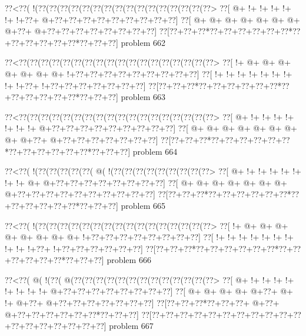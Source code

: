 \vbox{\vbox{\goo
\0??<\0??(\- !(\0??(\0??(\0??(\0??(\0??(\0??(\0??(\0??(\0??(\0??(\0??(\0??(\0??(\0??(\0??(\0??>
\0??[\- @+\- !+\- !+\- !+\- !+\- !+\- !+\0??+\- @+\0??+\0??+\0??+\0??+\0??+\0??+\0??+\0??+\0??]
\0??[\- @+\- @+\- @+\- @+\- @+\- @+\- @+\- @+\0??+\- @+\0??+\0??+\0??+\0??+\0??+\0??+\0??+\0??]
\0??[\0??+\0??+\0??*\0??+\0??+\0??+\0??+\0??+\0??*\0??+\0??+\0??+\0??+\0??+\0??*\0??+\0??+\0??]
}
\hfil problem 662\hfil\break
}



\vbox{\vbox{\goo
\0??<\0??(\0??(\0??(\0??(\0??(\0??(\0??(\0??(\0??(\0??(\0??(\0??(\0??(\0??(\0??(\0??(\0??(\0??>
\0??[\- !+\- @+\- @+\- @+\- @+\- @+\- @+\- @+\- !+\0??+\0??+\0??+\0??+\0??+\0??+\0??+\0??+\0??]
\0??[\- !+\- !+\- !+\- !+\- !+\- !+\- !+\- !+\- !+\0??+\- !+\0??+\0??+\0??+\0??+\0??+\0??+\0??]
\0??[\0??+\0??+\0??*\0??+\0??+\0??+\0??+\0??+\0??*\0??+\0??+\0??+\0??+\0??+\0??*\0??+\0??+\0??]
}
\hfil problem 663\hfil\break
}



\vbox{\vbox{\goo
\0??<\0??(\0??(\0??(\0??(\0??(\0??(\0??(\0??(\0??(\0??(\0??(\0??(\0??(\0??(\0??(\0??(\0??(\0??>
\0??[\- @+\- !+\- !+\- !+\- !+\- !+\- !+\- !+\- @+\0??+\0??+\0??+\0??+\0??+\0??+\0??+\0??+\0??]
\0??[\- @+\- @+\- @+\- @+\- @+\- @+\- @+\- @+\- @+\0??+\- @+\0??+\0??+\0??+\0??+\0??+\0??+\0??]
\0??[\0??+\0??+\0??*\0??+\0??+\0??+\0??+\0??+\0??*\0??+\0??+\0??+\0??+\0??+\0??*\0??+\0??+\0??]
}
\hfil problem 664\hfil\break
}



\vbox{\vbox{\goo
\0??<\0??(\- !(\0??(\0??(\0??(\0??(\0??(\- @(\- !(\0??(\0??(\0??(\0??(\0??(\0??(\0??(\0??(\0??>
\0??[\- @+\- !+\- !+\- !+\- !+\- !+\- !+\- !+\- @+\- @+\0??+\0??+\0??+\0??+\0??+\0??+\0??+\0??]
\0??[\- @+\- @+\- @+\- @+\- @+\- @+\- @+\- @+\0??+\0??+\0??+\0??+\0??+\0??+\0??+\0??+\0??+\0??]
\0??[\0??+\0??+\0??*\0??+\0??+\0??+\0??+\0??+\0??*\0??+\0??+\0??+\0??+\0??+\0??*\0??+\0??+\0??]
}
\hfil problem 665\hfil\break
}



\vbox{\vbox{\goo
\0??<\0??(\- !(\0??(\0??(\0??(\0??(\0??(\0??(\0??(\0??(\0??(\0??(\0??(\0??(\0??(\0??(\0??(\0??>
\0??[\- !+\- @+\- @+\- @+\- @+\- @+\- @+\- @+\- @+\- !+\0??+\0??+\0??+\0??+\0??+\0??+\0??+\0??]
\0??[\- !+\- !+\- !+\- !+\- !+\- !+\- !+\- !+\- !+\- !+\0??+\- !+\0??+\0??+\0??+\0??+\0??+\0??]
\0??[\0??+\0??+\0??*\0??+\0??+\0??+\0??+\0??+\0??*\0??+\0??+\0??+\0??+\0??+\0??*\0??+\0??+\0??]
}
\hfil problem 666\hfil\break
}



\vbox{\vbox{\goo
\0??<\0??(\- @(\- !(\0??(\- @(\0??(\0??(\0??(\0??(\0??(\0??(\0??(\0??(\0??(\0??(\0??(\0??(\0??>
\0??[\- @+\- !+\- !+\- !+\- !+\- !+\- !+\- !+\- !+\- @+\0??+\0??+\0??+\0??+\0??+\0??+\0??+\0??]
\0??[\- @+\- @+\- @+\- @+\- @+\0??+\- @+\- !+\- @+\0??+\- @+\0??+\0??+\0??+\0??+\0??+\0??+\0??]
\0??[\0??+\0??+\0??*\0??+\0??+\0??+\- @+\0??+\- @+\0??+\0??+\0??+\0??+\0??+\0??*\0??+\0??+\0??]
\0??[\0??+\0??+\0??+\0??+\0??+\0??+\0??+\0??+\0??+\0??+\0??+\0??+\0??+\0??+\0??+\0??+\0??+\0??]
}
\hfil problem 667\hfil\break
}



